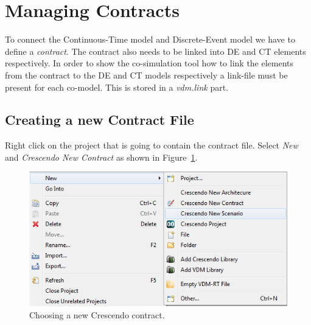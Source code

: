 \documentclass{crescendorepchap}
\begin{document}





\section{Managing Contracts}\label{sec:contract}

To connect the Continuous-Time model and Discrete-Event model 
we have to define a \emph{contract}. The contract also needs to be linked
into DE and CT elements respectively.
In order to show the co-simulation tool how to link the elements from
the contract to the DE and CT models respectively a link-file must be
present for each co-model. This is stored in a \emph{vdm.link} part.

\subsection{Creating a new Contract File}

Right click on the project that is going to contain the contract file.
Select \emph{New} and \emph{Crescendo New Contract} as shown in Figure~\ref{fig:newcontract}.

\begin{figure}[htbp]
\centering
\includegraphics[width=.6\textwidth]{images/DestecsNewContract.png}
\caption{Choosing a new Crescendo contract.\label{fig:newcontract}}
\end{figure}
\end{document}
